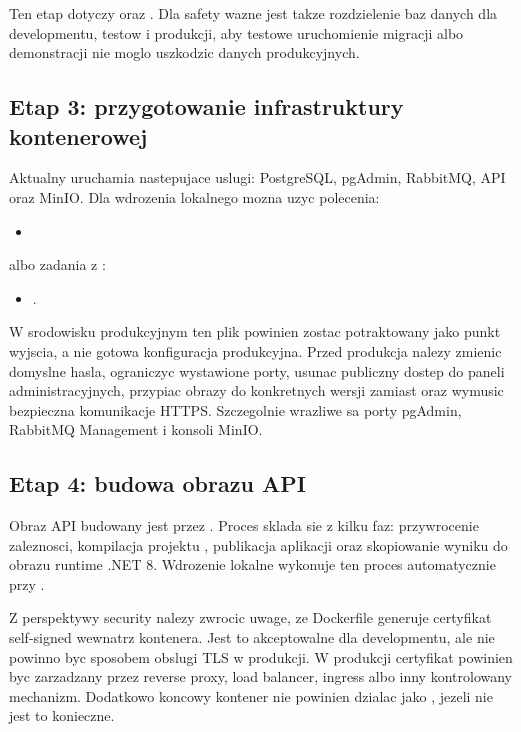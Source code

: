 \documentclass[12pt,a4paper]{article}
\begin{document}
Ten etap dotyczy  oraz . Dla safety wazne jest takze rozdzielenie baz danych dla developmentu, testow i produkcji, aby testowe uruchomienie migracji albo demonstracji nie moglo uszkodzic danych produkcyjnych.

\subsection{Etap 3: przygotowanie infrastruktury kontenerowej}

Aktualny  uruchamia nastepujace uslugi: PostgreSQL, pgAdmin, RabbitMQ, API oraz MinIO. Dla wdrozenia lokalnego mozna uzyc polecenia:

\begin{itemize}
    \item {}
\end{itemize}

albo zadania z :

\begin{itemize}
    \item {}.
\end{itemize}

W srodowisku produkcyjnym ten plik powinien zostac potraktowany jako punkt wyjscia, a nie gotowa konfiguracja produkcyjna. Przed produkcja nalezy zmienic domyslne hasla, ograniczyc wystawione porty, usunac publiczny dostep do paneli administracyjnych, przypiac obrazy do konkretnych wersji zamiast  oraz wymusic bezpieczna komunikacje HTTPS. Szczegolnie wrazliwe sa porty pgAdmin, RabbitMQ Management i konsoli MinIO.

\subsection{Etap 4: budowa obrazu API}

Obraz API budowany jest przez . Proces sklada sie z kilku faz: przywrocenie zaleznosci, kompilacja projektu , publikacja aplikacji oraz skopiowanie wyniku do obrazu runtime .NET 8. Wdrozenie lokalne wykonuje ten proces automatycznie przy .

Z perspektywy security nalezy zwrocic uwage, ze Dockerfile generuje certyfikat self-signed wewnatrz kontenera. Jest to akceptowalne dla developmentu, ale nie powinno byc sposobem obslugi TLS w produkcji. W produkcji certyfikat powinien byc zarzadzany przez reverse proxy, load balancer, ingress albo inny kontrolowany mechanizm. Dodatkowo koncowy kontener nie powinien dzialac jako , jezeli nie jest to konieczne.
\end{document}
